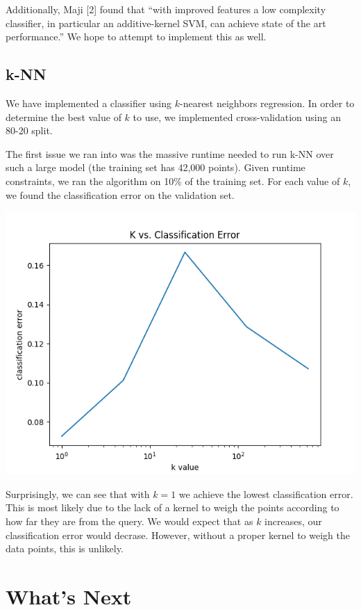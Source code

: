\documentclass{article} %
\begin{document}
Additionally, Maji [2] found that ``with improved features a low
complexity classifier, in particular
an additive-kernel SVM, can achieve state of the art performance.'' We hope to
attempt to implement this as well.

\subsection{k-NN}
We have implemented a classifier using $k$-nearest neighbors regression. In
order to determine the best value of $k$ to use, we implemented cross-validation
using an 80-20 split.

The first issue we ran into was the massive runtime needed to run k-NN over such
a large model (the training set has 42,000 points). Given runtime constraints,
we ran the algorithm on 10\% of the training set.
For each value of $k$, we found the classification error on the validation set.

\includegraphics{k-nn.png}

Surprisingly, we can see that with $k = 1$ we achieve the lowest classification
error. This is most likely due to the lack of a kernel to weigh the points
according to how far they are from the query. We would expect that as $k$
increases, our classification error would decrase. However, without a
proper kernel to weigh the data points, this is unlikely.

\section{What's Next}
\end{document}
